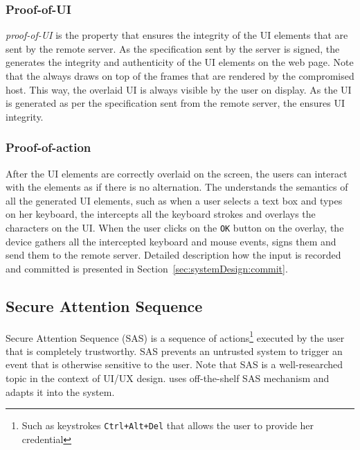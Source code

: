 \subsubsection{Proof-of-UI} \emph{proof-of-UI} is the property that ensures the integrity of the UI elements that are sent by the remote server. As the specification sent by the server is signed, the \device generates the integrity and authenticity of the UI elements on the web page. Note that the \device always draws on top of the frames that are rendered by the compromised host. This way, the overlaid UI is always visible by the user on display. As the UI is generated as per the specification sent from the remote server, the \device ensures UI integrity.

\subsubsection{Proof-of-action} After the UI elements are correctly overlaid on the screen, the users can interact with the elements as if there is no alternation. The \device understands the semantics of all the generated UI elements, such as when a user selects a text box and types on her keyboard, the \device intercepts all the keyboard strokes and overlays the characters on the UI. When the user clicks on the \texttt{OK} button on the overlay, the device gathers all the intercepted keyboard and mouse events, signs them and send them to the remote server. Detailed description how the input is recorded and committed is presented in Section~\ref{sec:systemDesign:commit}.



\subsection{Secure Attention Sequence}
\label{sec:systemDesign:SAS}

Secure Attention Sequence (SAS) is a sequence of actions\footnote{Such as keystrokes \texttt{Ctrl+Alt+Del} that allows the user to provide her credential} executed by the user that is completely trustworthy. SAS prevents an untrusted system to trigger an event that is otherwise sensitive to the user. Note that SAS is a well-researched topic in the context of UI/UX design. \name uses off-the-shelf SAS mechanism and adapts it into the system. 

